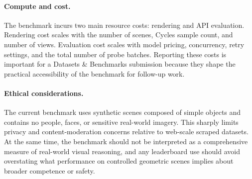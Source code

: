 \paragraph{Compute and cost.}
The benchmark incurs two main resource costs: rendering and API evaluation. Rendering cost scales with the number of scenes, Cycles sample count, and number of views. Evaluation cost scales with model pricing, concurrency, retry settings, and the total number of probe batches. Reporting these costs is important for a Datasets \& Benchmarks submission because they shape the practical accessibility of the benchmark for follow-up work.

\paragraph{Ethical considerations.}
The current benchmark uses synthetic scenes composed of simple objects and contains no people, faces, or sensitive real-world imagery. This sharply limits privacy and content-moderation concerns relative to web-scale scraped datasets. At the same time, the benchmark should not be interpreted as a comprehensive measure of real-world visual reasoning, and any leaderboard use should avoid overstating what performance on controlled geometric scenes implies about broader competence or safety.
